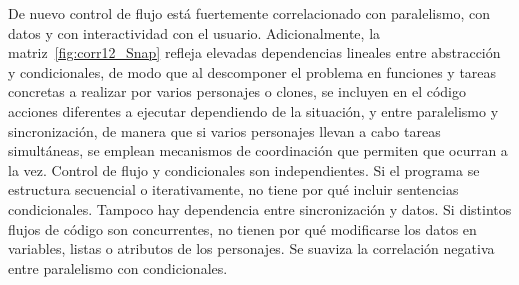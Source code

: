 \documentclass[a4paper, 12pt]{book}
\begin{document}
De nuevo control de flujo está fuertemente correlacionado con paralelismo, con datos y con interactividad con el usuario. Adicionalmente, la matriz~\ref{fig:corr12_Snap} refleja elevadas dependencias lineales entre abstracción y condicionales, de modo que al descomponer el problema en funciones y tareas concretas a realizar por varios personajes o clones, se incluyen en el código acciones diferentes a ejecutar dependiendo de la situación, y entre paralelismo y sincronización, de manera que si varios personajes llevan a cabo tareas simultáneas, se emplean mecanismos de coordinación que permiten que ocurran a la vez. Control de flujo y condicionales son independientes.
Si el programa se estructura secuencial o iterativamente, no tiene por qué incluir sentencias condicionales. Tampoco hay dependencia  entre sincronización y datos. Si distintos flujos de código son concurrentes, no tienen por qué modificarse los datos en variables, listas o atributos de los personajes. Se suaviza la correlación negativa entre paralelismo con condicionales.
\end{document}

